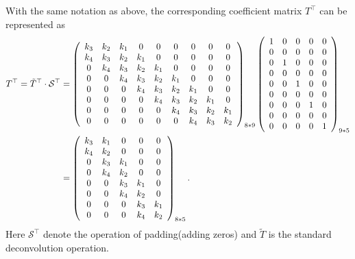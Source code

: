 With the same notation as above, the corresponding coefficient matrix $T^\top$ can be represented as 
\begin{align}
   T^\top = \tilde{T}^\top\cdot  \mathcal S^\top &= 
\left(
  \begin{array}{ccccccccc}
     k_3 & k_2 & k_1 & 0 & 0 & 0 & 0 & 0  & 0\\
     k_4 & k_3 & k_2 & k_1 & 0 & 0 & 0 &  0 & 0\\
     0 & k_4 & k_3 & k_2 & k_1 & 0 & 0 & 0 & 0\\
     0 & 0 & k_4 & k_3 & k_2 & k_1 & 0 & 0  & 0\\
     0 & 0 & 0 & k_4 & k_3 & k_2 & k_1 & 0  & 0\\
     0 & 0 & 0 & 0 & k_4 & k_3 & k_2 & k_1  & 0\\
     0 & 0 & 0 & 0 & 0 & k_4 & k_3 & k_2 & k_1  \\
     0 & 0 & 0 & 0 & 0 & 0  & k_4 & k_3 & k_2   \\
  \end{array}
\right)_{8*9}
\left(
  \begin{array}{ccccc}
     1 & 0 & 0 & 0 & 0  \\
     0 & 0 & 0 & 0 & 0  \\
     0 & 1 & 0 & 0 & 0  \\
     0 & 0 & 0 & 0 & 0  \\
     0 & 0 & 1 & 0 & 0  \\
     0 & 0 & 0 & 0 & 0  \\
     0 & 0 & 0 & 1 & 0  \\
     0 & 0 & 0 & 0 & 0  \\
     0 & 0 & 0 & 0 & 1  \\
  \end{array}
\right)_{9*5}
\\ \notag 
&= 
\left(
  \begin{array}{ccccc}
     k_3 & k_1 & 0 & 0 & 0   \\
     k_4 & k_2 & 0 & 0 & 0   \\
     0 & k_3 & k_1 & 0 & 0  \\     
     0 & k_4 & k_2 & 0 & 0  \\
     0 & 0 & k_3 & k_1 & 0  \\
     0 & 0 & k_4 & k_2 & 0  \\
     0 & 0 & 0 & k_3 & k_1  \\
     0 & 0 & 0 & k_4 & k_2  \\
  \end{array}
\right)_{8*5}.
\end{align}
Here $\mathcal S^\top$ denote the operation of padding(adding zeros) and $\tilde{T}$ is the standard deconvolution operation.

